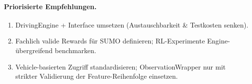 \paragraph{Priorisierte Empfehlungen.}
\begin{enumerate}
  \item DrivingEngine + Interface umsetzen (Austauschbarkeit \& Testkosten senken).
  \item Fachlich valide Rewards für SUMO definieren; RL-Experimente Engine-übergreifend benchmarken.
  \item Vehicle-basierten Zugriff standardisieren; ObservationWrapper nur mit strikter Validierung der Feature-Reihenfolge einsetzen.
\end{enumerate}


